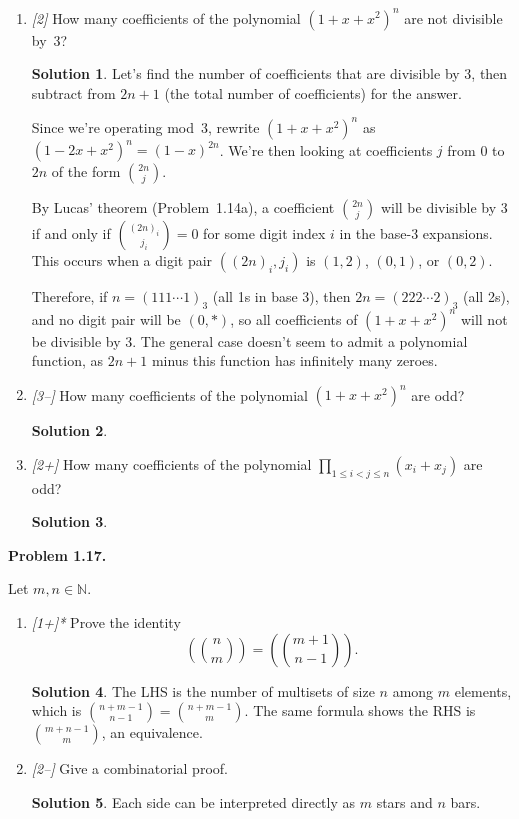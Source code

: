 \documentclass[11pt]{article}
\theoremstyle{definition}
\newtheorem*{solution}{Solution}
\newcommand{\N}{\mathbb{N}}
\newcommand{\multiset}[2]{\left(\!\binom{#1}{#2}\!\right)}
\newcounter{probnum}
\newcommand{\problem}[1]{%
  \setcounter{probnum}{#1}%
  \medskip
  \noindent\textbf{Problem 1.#1.}\quad
}
\begin{document}
\begin{enumerate}[label=(\alph*)]
  \item \textit{[2]} How many coefficients of the polynomial $(1+x+x^2)^n$ are not
    divisible by~3?
    \begin{solution}
    Let's find the number of coefficients that are divisible by 3, then subtract
    from $2n+1$ (the total number of coefficients) for the answer.

    Since we're operating mod~3, rewrite $(1+x+x^2)^n$ as $(1-2x+x^2)^n = (1-x)^{2n}$.
    We're then looking at coefficients $j$ from 0 to $2n$ of the form $\binom{2n}{j}$.

    By Lucas' theorem (Problem~1.14a), a coefficient $\binom{2n}{j}$ will be
    divisible by 3 if and only if $\binom{(2n)_i}{j_i} = 0$ for some digit index $i$
    in the base-3 expansions. This occurs when a digit pair $((2n)_i, j_i)$ is
    $(1,2)$, $(0,1)$, or $(0,2)$.

    Therefore, if $n = (111\cdots1)_3$ (all 1s in base 3), then $2n = (222\cdots2)_3$
    (all 2s), and no digit pair will be $(0,*)$, so all coefficients of $(1+x+x^2)^n$
    will not be divisible by 3.  The general case doesn't seem to admit a polynomial
    function, as $2n+1$ minus this function has infinitely many zeroes.
    \end{solution}

  \item \textit{[3--]} How many coefficients of the polynomial $(1+x+x^2)^n$ are odd?
    \begin{solution}
    \end{solution}

  \item \textit{[2+]} How many coefficients of the polynomial
    $\prod_{1\leq i<j\leq n}(x_i+x_j)$ are odd?
    \begin{solution}
    \end{solution}
\end{enumerate}

\problem{17}
Let $m, n \in \N$.

\begin{enumerate}[label=(\alph*)]
  \item \textit{[1+]*} Prove the identity
    \[ \multiset{n}{m} = \multiset{m+1}{n-1}. \]
    \begin{solution}
    The LHS is the number of multisets of size $n$ among $m$ elements, which is
    $\binom{n+m-1}{n-1} = \binom{n+m-1}{m}$. The same formula shows the RHS is
    $\binom{m+n-1}{m}$, an equivalence.
    \end{solution}

  \item \textit{[2--]} Give a combinatorial proof.
    \begin{solution}
    Each side can be interpreted directly as $m$ stars and $n$ bars.
    \end{solution}
\end{enumerate}
\end{document}
